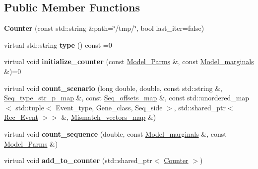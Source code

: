 \subsection*{Public Member Functions}
\begin{DoxyCompactItemize}
\item 
\mbox{\label{classCounter_a1ff0e754623c886cae1b76ab93a96faa}} 
{\bfseries Counter} (const std\+::string \&path=\char`\"{}/tmp/\char`\"{}, bool last\+\_\+iter=false)
\item 
\mbox{\label{classCounter_a13bbd01b9db02df144a4b303d0a8fc9a}} 
virtual std\+::string {\bfseries type} () const =0
\item 
\mbox{\label{classCounter_a56a86bc9430be6e0e9c8cf612b42a857}} 
virtual void {\bfseries initialize\+\_\+counter} (const \hyperlink{classModel__Parms}{Model\+\_\+\+Parms} \&, const \hyperlink{classModel__marginals}{Model\+\_\+marginals} \&)=0
\item 
\mbox{\label{classCounter_a2aa0558b76714d3e5e11fee7dc310639}} 
virtual void {\bfseries count\+\_\+scenario} (long double, double, const std\+::string \&, \hyperlink{classEnum__fast__memory__map}{Seq\+\_\+type\+\_\+str\+\_\+p\+\_\+map} \&, const \hyperlink{classEnum__fast__memory__dual__key__map}{Seq\+\_\+offsets\+\_\+map} \&, const std\+::unordered\+\_\+map$<$ std\+::tuple$<$ Event\+\_\+type, Gene\+\_\+class, Seq\+\_\+side $>$, std\+::shared\+\_\+ptr$<$ \hyperlink{classRec__Event}{Rec\+\_\+\+Event} $>$$>$ \&, \hyperlink{classEnum__fast__memory__map}{Mismatch\+\_\+vectors\+\_\+map} \&)
\item 
\mbox{\label{classCounter_a2ceec8c6539b9912d1a6eb72a8a9d895}} 
virtual void {\bfseries count\+\_\+sequence} (double, const \hyperlink{classModel__marginals}{Model\+\_\+marginals} \&, const \hyperlink{classModel__Parms}{Model\+\_\+\+Parms} \&)
\item 
\mbox{\label{classCounter_a1cbad4a20ed2bc666923c52f1f7de07c}} 
virtual void {\bfseries add\+\_\+to\+\_\+counter} (std\+::shared\+\_\+ptr$<$ \hyperlink{classCounter}{Counter} $>$)
\item 
\mbox{\label{classCounter_a108d1d8b84d1a4ec02e82d115bb090f0}} 
$$
\end{DoxyCompactItemize}
